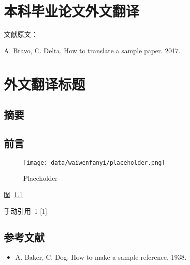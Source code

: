 {
\renewcommand{\baselinestretch}{1.25}\selectfont

{
  \titleformat{\chapter}[block]{\erhao\songti\bfseries\filcenter}{}{0em}{}{}
  \chapter{本科毕业论文外文翻译}
}

{
  \setlength{\parindent}{0em}

  文献原文：

  A. Bravo, C. Delta. How to translate a sample paper. 2017. \par
}

\vspace{2em}

{
  \renewcommand{\cleardoublepage}{}
  \renewcommand{\clearpage}{}
  \titleformat{\chapter}[block]{\sanhao\songti\bfseries\filcenter}{}{0em}{}{}
  \chapter*{外文翻译标题}
}

\section*{摘要}

\section{前言}

\begin{figure}[!htbp]
\centering
\texttt{[image: data/waiwenfanyi/placeholder.png]}
\caption{Placeholder}
\label{figure:placeholder}
\end{figure}

图~\ref{figure:placeholder}

手动引用~1 {[}1{]}

\section*{参考文献}

\begin{itemize}
\item [{[}1{]}] A. Baker, C. Dog. How to make a sample reference. 1938.
\end{itemize}
}

